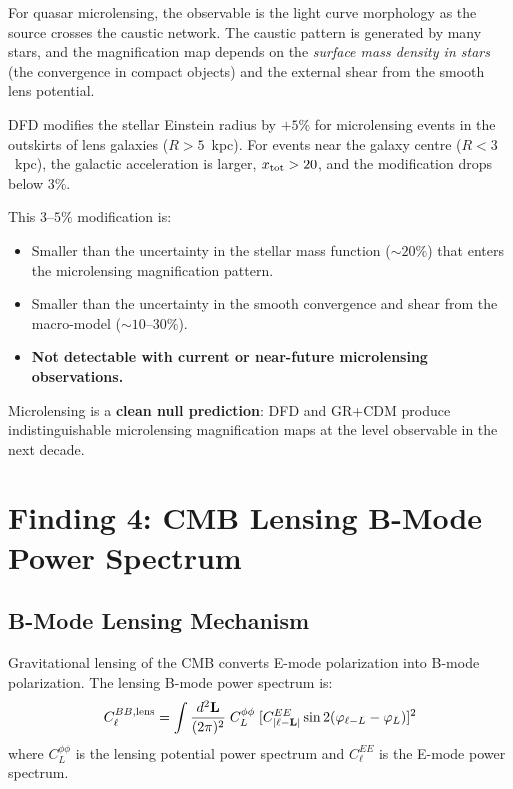 \documentclass[11pt,a4paper]{article}
\begin{document}
For quasar microlensing, the observable is the light curve morphology
as the source crosses the caustic network.  The caustic pattern is
generated by many stars, and the magnification map depends on the
\emph{surface mass density in stars} (the convergence in compact objects)
and the external shear from the smooth lens potential.

\begin{tcolorbox}[colback=blue!5!white, colframe=blue!50!black,
  title=\textbf{Microlensing Prediction}]
DFD modifies the stellar Einstein radius by $+5\%$ for microlensing
events in the outskirts of lens galaxies ($R > 5$~kpc).  For events
near the galaxy centre ($R < 3$~kpc), the galactic acceleration is
larger, $x_{\rm tot} > 20$, and the modification drops below $3\%$.

This $3$--$5\%$ modification is:
\begin{itemize}
\item Smaller than the uncertainty in the stellar mass function
  ($\sim 20\%$) that enters the microlensing magnification pattern.
\item Smaller than the uncertainty in the smooth convergence and shear
  from the macro-model ($\sim 10$--$30\%$).
\item \textbf{Not detectable with current or near-future microlensing
  observations.}
\end{itemize}

Microlensing is a \textbf{clean null prediction}: DFD and GR+CDM
produce indistinguishable microlensing magnification maps at the
level observable in the next decade.
\end{tcolorbox}


\section{Finding 4: CMB Lensing B-Mode Power Spectrum}
\label{sec:bmode}

\subsection{B-Mode Lensing Mechanism}

Gravitational lensing of the CMB converts E-mode polarization into
B-mode polarization.  The lensing B-mode power spectrum is:
\begin{equation}
C_\ell^{BB,\rm lens} = \int \frac{d^2\mathbf{L}}{(2\pi)^2}\;
C_L^{\phi\phi}\;[C_{|\ell-\mathbf{L}|}^{EE}\sin 2(\varphi_{\ell-L}
- \varphi_L)]^2
\end{equation}
where $C_L^{\phi\phi}$ is the lensing potential power spectrum and
$C_\ell^{EE}$ is the E-mode power spectrum.
\end{document}
